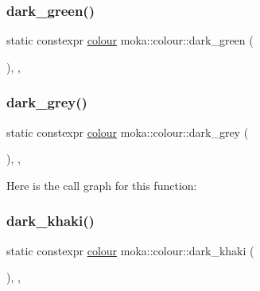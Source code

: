 \subsubsection{\texorpdfstring{dark\_green()}{dark\_green()}}
{\footnotesize\ttfamily static constexpr \mbox{\hyperlink{classmoka_1_1colour}{colour}} moka\+::colour\+::dark\+\_\+green (\begin{DoxyParamCaption}{ }\end{DoxyParamCaption})\hspace{0.3cm}{\ttfamily [inline]}, {\ttfamily [static]}, {\ttfamily [noexcept]}}

\mbox{\label{classmoka_1_1colour_a49aa7fd7973c1953755efa5b88031ca5}} 
\subsubsection{\texorpdfstring{dark\_grey()}{dark\_grey()}}
{\footnotesize\ttfamily static constexpr \mbox{\hyperlink{classmoka_1_1colour}{colour}} moka\+::colour\+::dark\+\_\+grey (\begin{DoxyParamCaption}{ }\end{DoxyParamCaption})\hspace{0.3cm}{\ttfamily [inline]}, {\ttfamily [static]}, {\ttfamily [noexcept]}}

Here is the call graph for this function\+:
\mbox{\label{classmoka_1_1colour_a57d7a46d18cbc113703aafd4f2be9c20}} 
\subsubsection{\texorpdfstring{dark\_khaki()}{dark\_khaki()}}
{\footnotesize\ttfamily static constexpr \mbox{\hyperlink{classmoka_1_1colour}{colour}} moka\+::colour\+::dark\+\_\+khaki (\begin{DoxyParamCaption}{ }\end{DoxyParamCaption})\hspace{0.3cm}{\ttfamily [inline]}, {\ttfamily [static]}, {\ttfamily [noexcept]}}

\mbox{\label{classmoka_1_1colour_a473b1241ff0bdf245e529bdc5d03968a}} 
